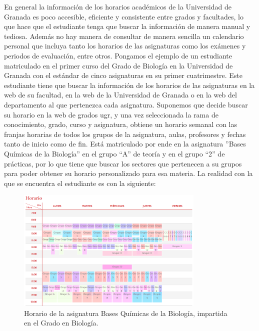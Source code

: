 En general la información de los horarios académicos de la Universidad de Granada es poco accesible, eficiente y consistente entre grados y facultades, lo que hace que el estudiante tenga que buscar la información de manera manual y tediosa.
Además no hay manera de consultar de manera sencilla un calendario personal que incluya tanto los horarios de las asignaturas como los exámenes y periodos de evaluación, entre otros.
\newline\newline
Pongamos el ejemplo de un estudiante matriculado en el primer curso del Grado de Biología en la Universidad de Granada con el estándar de cinco asignaturas en su primer cuatrimestre. 
Este estudiante tiene que buscar la información de los horarios de las asignaturas en la web de su facultad, en la web de la Universidad de Granada o en la web del departamento al que pertenezca cada asignatura.
Suponemos que decide buscar su horario en la web de grados ugr, y una vez seleccionada la rama de conocimiento, grado, curso y asignatura, obtiene un horario semanal con las franjas horarias de todos los grupos de la asignatura, aulas, profesores y fechas tanto de inicio como de fin.
Está matriculado por ende en la asignatura ''Bases Químicas de la Biología'' en el grupo ``A'' de teoría y en el grupo ``2'' de prácticas, por lo que tiene que buscar los sectores que pertenecen a su grupos para poder obtener su horario personalizado para esa materia.
\newline\newline
La realidad con la que se encuentra el estudiante es con la siguiente:

\begin{figure}[H]
    \centering
    \includegraphics[width=0.8\textwidth]{figures/02_horario_biologia.png}
    \caption{Horario de la asignatura Bases Químicas de la Biología, impartida en el Grado en Biología.}
    \label{fig:horario_biologia}
\end{figure}

